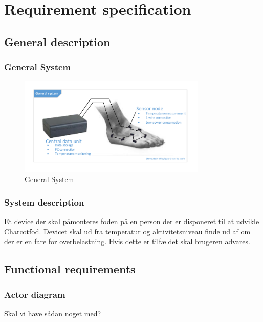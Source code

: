 \chapter{Requirement specification}
\section{General description}
\subsection{General System}
\begin{figure}[H]
	\centering
	\includegraphics[width=0.8\textwidth]{billeder/GeneralSystem}
	\caption{General System}
\end{figure}

\subsection{System description}
Et device der skal påmonteres foden på en person der er disponeret til at udvikle Charcotfod. Devicet skal ud fra temperatur og aktivitetsniveau finde ud af om der er en fare for overbelastning. Hvis dette er tilfældet skal brugeren advares.



\section{Functional requirements}
\subsection{Actor diagram}
Skal vi have sådan noget med?

